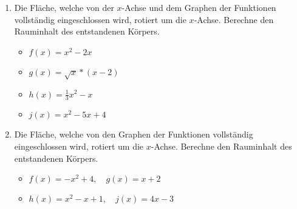 \begin{enumerate}
  \item Die Fläche, welche von der $x$-Achse und dem Graphen der Funktionen vollständig eingeschlossen wird, rotiert um die $x$-Achse.
  Berechne den Rauminhalt des entstandenen Körpers.
  \begin{itemize}
    \item $f(x)=x^2-2x$
    \item $g(x)=\sqrt{x}*(x-2)$
    \item $h(x)=\frac 1 3 x^2-x$
    \item $j(x)=x^2-5x+4$
  \end{itemize}
  \item Die Fläche, welche von den Graphen der Funktionen vollständig eingeschlossen wird, rotiert um die $x$-Achse.
  Berechne den Rauminhalt des entstandenen Körpers.
  \begin{itemize}
    \item $f(x)= -x^2+4, \quad g(x)= x+2$
    \item $h(x)= x^2-x+1, \quad j(x)= 4x-3$
  \end{itemize}
\end{enumerate}





